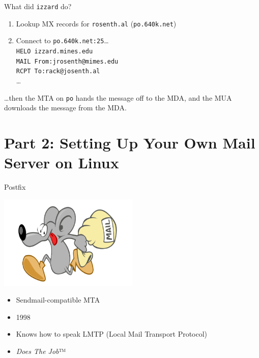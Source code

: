 \documentclass{lug}
\begin{document}
\begin{frame}{What did \texttt{izzard} do?}
    \begin{enumerate}[<+->]
        \item Lookup MX records for \texttt{rosenth.al} (\texttt{po.640k.net})
        \item Connect to \texttt{po.640k.net:25}\dots \\
            \texttt{HELO izzard.mines.edu} \\
            \texttt{MAIL From:jrosenth@mimes.edu} \\
            \texttt{RCPT To:rack@josenth.al} \\
            \dots
    \end{enumerate}
    \pause[\thebeamerpauses]
    \dots{}then the MTA on \texttt{po} hands the message off to the MDA, and
    the MUA downloads the message from the MDA.
\end{frame}

\section{Part 2: Setting Up Your Own Mail Server on Linux}

\begin{frame}{Postfix}
    \begin{center}
        \includegraphics[width=0.5\textwidth]{graphics/mysza.png}
    \end{center}

    \begin{itemize}[<+->]
        \item Sendmail-compatible MTA
        \item 1998
        \item Knows how to speak LMTP (Local Mail Transport Protocol)
        \item \emph{Does The Job}™
    \end{itemize}
\end{frame}
\end{document}
